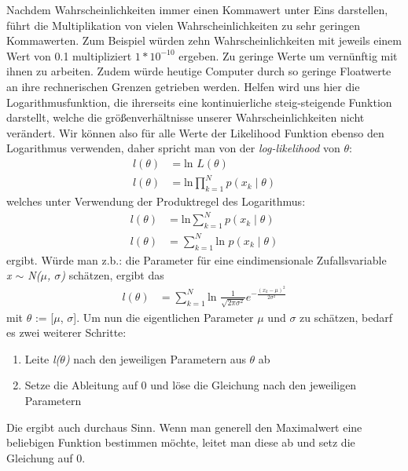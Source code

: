 Nachdem Wahrscheinlichkeiten immer einen Kommawert unter Eins darstellen, führt die Multiplikation von vielen Wahrscheinlichkeiten zu sehr geringen Kommawerten.
Zum Beispiel würden zehn Wahrscheinlichkeiten mit jeweils einem Wert von 0.1 multipliziert $1 * 10^{-10}$ ergeben. Zu geringe Werte um vernünftig mit ihnen zu arbeiten.
Zudem würde heutige Computer durch so geringe Floatwerte an ihre rechnerischen Grenzen getrieben werden. 
Helfen wird uns hier die Logarithmusfunktion, die ihrerseits eine kontinuierliche steig-steigende Funktion darstellt, welche die größenverhältnisse unserer Wahrscheinlichkeiten nicht verändert. 
Wir können also für alle Werte der Likelihood Funktion ebenso den Logarithmus verwenden, daher spricht man von der \textit{log-likelihood} von \textit{$\theta$}:
\begin{align*}
	l(\theta) &= \text{ln }L(\theta) \\
	l(\theta) &= \text{ln}\prod_{k=1}^N p(x_k\mid\theta)
\end{align*}
welches unter Verwendung der Produktregel des Logarithmus:
\begin{align*}
	l(\theta) &= \text{ln}\sum_{k=1}^N p(x_k\mid\theta) \\
	l(\theta) &= \sum_{k=1}^N \text{ln }p(x_k\mid\theta)
\end{align*}
ergibt. Würde man z.b.: die Parameter für eine eindimensionale Zufallsvariable \\
\textit{x $\sim$ N($\mu$, $\sigma$)} schätzen, ergibt das
\begin{align*}
	l(\theta) &= \sum_{k=1}^N \text{ln }\frac{1}{\sqrt{2\pi\sigma^2}}e^{-\frac{(x_k-\mu)^2}{2\sigma^2}}
\end{align*}
mit $\theta$ := [\textit{$\mu$}, \textit{$\sigma$}]. Um nun die eigentlichen Parameter $\mu$ und $\sigma$ zu schätzen, bedarf es zwei weiterer Schritte:
\begin{enumerate}
	\item Leite {\textit{l($\theta$)} nach den jeweiligen Parametern aus $\theta$ ab}
	\item {Setze die Ableitung auf 0 und löse die Gleichung nach den jeweiligen Parametern}
\end{enumerate}
Die ergibt auch durchaus Sinn. Wenn man generell den Maximalwert eine beliebigen Funktion bestimmen möchte, leitet man diese ab und setz die Gleichung auf 0.

